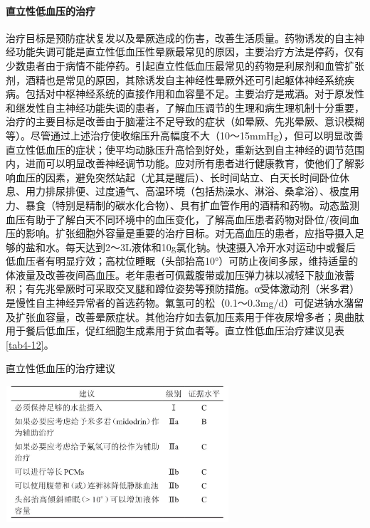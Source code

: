\paragraph{直立性低血压的治疗}

治疗目标是预防症状复发以及晕厥造成的伤害，改善生活质量。药物诱发的自主神经功能失调可能是直立性低血压性晕厥最常见的原因，主要治疗方法是停药，仅有少数患者由于病情不能停药。引起直立性低血压最常见的药物是利尿剂和血管扩张剂，酒精也是常见的原因，其除诱发自主神经性晕厥外还可引起躯体神经系统疾病。包括对中枢神经系统的直接作用和血容量不足。主要治疗是戒酒。对于原发性和继发性自主神经功能失调的患者，了解血压调节的生理和病生理机制十分重要，治疗的主要目标是改善由于脑灌注不足导致的症状（如晕厥、先兆晕厥、意识模糊等）。尽管通过上述治疗使收缩压升高幅度不大（10～15mmHg），但可以明显改善直立性低血压的症状；使平均动脉压升高恰到好处，重新达到自主神经的调节范围内，进而可以明显改善神经调节功能。应对所有患者进行健康教育，使他们了解影响血压的因素，避免突然站起（尤其是醒后）、长时间站立、白天长时间卧位休息、用力排尿排便、过度通气、高温环境（包括热澡水、淋浴、桑拿浴）、极度用力、暴食（特别是精制的碳水化合物）、具有扩血管作用的酒精和药物。动态监测血压有助于了解白天不同环境中的血压变化，了解高血压患者药物对卧位/夜间血压的影响。扩张细胞外容量是重要的治疗目标。对无高血压的患者，应指导摄入足够的盐和水。每天达到2～3L液体和10g氯化钠。快速摄入冷开水对运动中或餐后低血压者有明显疗效；高枕位睡眠（头部抬高10°）可防止夜间多尿，维持适量的体液量及改善夜间高血压。老年患者可佩戴腹带或加压弹力袜以减轻下肢血液蓄积；有先兆晕厥时可采取交叉腿和蹲位姿势等预防措施。α受体激动剂（米多君）是慢性自主神经异常者的首选药物。氟氢可的松（0.1～0.3mg/d）可促进钠水潴留及扩张血容量，改善晕厥症状。其他治疗如去氨加压素用于伴夜尿增多者；奥曲肽用于餐后低血压，促红细胞生成素用于贫血者等。直立性低血压治疗建议见表\ref{tab4-12}。

\begin{table}[htbp]
\centering
\caption{直立性低血压的治疗建议}
\label{tab4-12}
\includegraphics[width=3.27083in,height=2in]{./images/Image00030.jpg}
\end{table}

